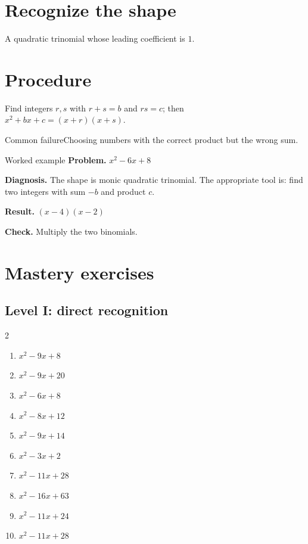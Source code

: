 \documentclass[11pt,oneside]{book}
\begin{document}
\section{Recognize the shape}
A quadratic trinomial whose leading coefficient is $1$.
\section{Procedure}
Find integers $r,s$ with $r+s=b$ and $rs=c$; then $x^2+bx+c=(x+r)(x+s)$.

\begin{warningbox}{Common failure}Choosing numbers with the correct product but the wrong sum.\end{warningbox}
\begin{examplebox}{Worked example}
\textbf{Problem.} $ x^{2} - 6 x + 8 $

\textbf{Diagnosis.} The shape is monic quadratic trinomial. The appropriate tool is: find two integers with sum $-b$ and product $c$.

\textbf{Result.} $ \left(x - 4\right) \left(x - 2\right) $

\textbf{Check.} Multiply the two binomials.
\end{examplebox}
\section{Mastery exercises}
\subsection*{Level I: direct recognition}
\begin{multicols}{2}
\begin{enumerate}[leftmargin=*,label=\textbf{\arabic*.},itemsep=0.65\baselineskip]
\item $ x^{2} - 9 x + 8 $
\item $ x^{2} - 9 x + 20 $
\item $ x^{2} - 6 x + 8 $
\item $ x^{2} - 8 x + 12 $
\item $ x^{2} - 9 x + 14 $
\item $ x^{2} - 3 x + 2 $
\item $ x^{2} - 11 x + 28 $
\item $ x^{2} - 16 x + 63 $
\item $ x^{2} - 11 x + 24 $
\item $ x^{2} - 11 x + 28 $
\end{enumerate}
\end{multicols}
\end{document}

